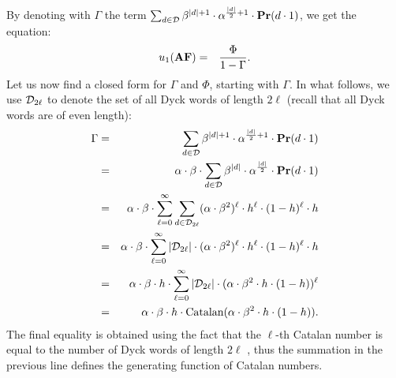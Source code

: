 %
By denoting with $\Gamma$ the term $\sum_{d\in \mathcal{D}} \beta^{|d|+1}\cdot  \alpha^{\frac{|d|}{2}+1}\cdot \mathbf{Pr}(d\cdot 1)$, we get the equation:
\begin{eqnarray*}
u_1(\text{\rm {\bf AF}}) & = &  \frac{\Phi}{1-\Gamma}.
\end{eqnarray*}
Let us now find a closed form for $\Gamma$ and $\Phi$, starting with $\Gamma$. In what follows, we use $\mathcal{D}_{2\ell}$ to denote the set of all Dyck words of length $2\ell$ (recall that all Dyck words are of even length):
%
\begin{eqnarray*}
\Gamma & = & \sum_{d\in \mathcal{D}} \beta^{|d|+1}\cdot  \alpha^{\frac{|d|}{2}+1}\cdot \mathbf{Pr}(d\cdot 1)\\
 & = & \alpha\cdot \beta \cdot \sum_{d\in \mathcal{D}} \beta^{|d|}\cdot  \alpha^{\frac{|d|}{2}}\cdot \mathbf{Pr}(d\cdot 1) \\
  & = & \alpha\cdot \beta \cdot \sum_{\ell = 0}^{\infty} \sum_{d\in \mathcal{D}_{2\ell}} (\alpha\cdot \beta^2)^{\ell}\cdot h^{\ell}\cdot (1-h)^{\ell}\cdot h\\
   & = &  \alpha\cdot \beta \cdot \sum_{\ell = 0}^{\infty} |\mathcal{D}_{2\ell}| \cdot (\alpha\cdot \beta^2)^{\ell}\cdot h^{\ell}\cdot (1-h)^{\ell}\cdot h\\
   & = &  \alpha\cdot \beta \cdot h \cdot \sum_{\ell = 0}^{\infty} |\mathcal{D}_{2\ell}| \cdot (\alpha\cdot \beta^2 \cdot h \cdot (1-h))^{\ell}\\
    & = &  \alpha\cdot \beta \cdot h \cdot \text{\rm Catalan}(\alpha\cdot\beta^2 \cdot h \cdot (1-h)).
\end{eqnarray*}
%
The final equality is obtained using the fact that the $\ell$-th Catalan number is equal to the number of Dyck words of length $2\ell$ \cite{??}, thus the summation in the previous line defines the generating function of Catalan numbers.


